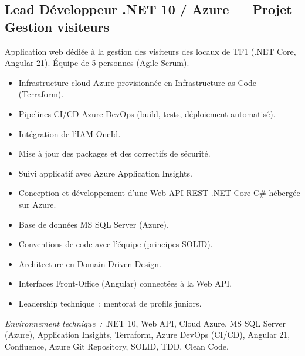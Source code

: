 \documentclass[10pt,a4paper]{article}
\begin{document}
\vspace{4pt}

\subsection*{Lead Développeur .NET 10 / Azure --- Projet Gestion visiteurs}
\color{darkgray}
Application web dédiée à la gestion des visiteurs des locaux de TF1 (.NET Core, Angular 21). Équipe de 5 personnes (Agile Scrum).
\begin{itemize}
  \item Infrastructure cloud Azure provisionnée en Infrastructure as Code (Terraform).
  \item Pipelines CI/CD Azure DevOps (build, tests, déploiement automatisé).
  \item Intégration de l'IAM OneId.
  \item Mise à jour des packages et des correctifs de sécurité.
  \item Suivi applicatif avec Azure Application Insights.
  \item Conception et développement d'une Web API REST .NET Core C\# hébergée sur Azure.
  \item Base de données MS SQL Server (Azure).
  \item Conventions de code avec l'équipe (principes SOLID).
  \item Architecture en Domain Driven Design.
  \item Interfaces Front-Office (Angular) connectées à la Web API.
  \item Leadership technique~: mentorat de profils juniors.
\end{itemize}
\textit{Environnement technique~:} .NET 10, Web API, Cloud Azure, MS SQL Server (Azure), Application Insights, Terraform, Azure DevOps (CI/CD), Angular 21, Confluence, Azure Git Repository, SOLID, TDD, Clean Code.

\vspace{6pt}
\end{document}

